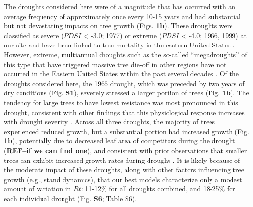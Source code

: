 \documentclass[
]{article}
\begin{document}
The droughts considered here were of a magnitude that has occurred with
an average frequency of approximately once every 10-15 years \citep[Fig.
\textbf{1a},][]{helcoski_growing_2019} and had substantial but not
devastating impacts on tree growth (Figs. \textbf{1b}). These droughts
were classified as severe (\(PDSI\) \textless{} -3.0; 1977) or extreme
(\(PDSI\) \textless{} -4.0; 1966, 1999) at our site and have been linked
to tree mortality in the eastern United States
\citep{druckenbrod_redefining_2019}. However, extreme, multiannual
droughts such as the so-called ``megadroughts'' of this type that have
triggered massive tree die-off in other regions
\citep[e.g.,][]{allen_global_2010, stovall_tree_2019} have not occurred
in the Eastern United States within the past several decades
\citep{clark_impacts_2016}. Of the droughts considered here, the 1966
drought, which was preceded by two years of dry conditions (Fig.
\textbf{S1}), severely stressed a larger portion of trees (Fig.
\textbf{1b}). The tendency for large trees to have lowest resistance was
most pronounced in this drought, consistent with other findings that
this physiological response increases with drought severity
\citep{bennett_larger_2015, stovall_tree_2019}. Across all three
droughts, the majority of trees experienced reduced growth, but a
substantial portion had increased growth (Fig. \textbf{1b}), potentially
due to decreased leaf area of competitors during the drought
(\textbf{REF--if we can find one}), and consistent with prior
observations that smaller trees can exhibit increased growth rates
during drought \citep{bennett_larger_2015}. It is likely because of the
moderate impact of these droughts, along with other factors influencing
tree growth (e.g., stand dynamics), that our best models characterize
only a modest amount of variation in \(Rt\): 11-12\% for all droughts
combined, and 18-25\% for each individual drought (Fig. \textbf{S6};
Table S6).
\end{document}
